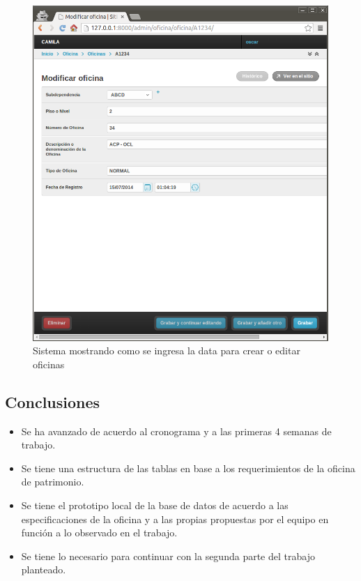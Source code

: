 \begin{figure}[h!]
  \centering
  \includegraphics[scale=0.4]{images/activities/camila/admin-oficinas-2.png}
  \caption{Sistema mostrando como se ingresa la data para crear o editar oficinas}
  \label{fig:admin-oficinas-2}
\end{figure}

\subsection{Conclusiones}

\begin{itemize}
\item Se ha avanzado de acuerdo al cronograma y a las primeras 4 semanas de trabajo.
\item Se tiene una estructura de las tablas en base a los requerimientos de la oficina de patrimonio.
\item Se tiene el prototipo local de la base de datos de acuerdo a las especificaciones de la oficina y a las propias propuestas por el equipo en función a lo observado en el trabajo.
\item Se tiene lo necesario para continuar con la segunda parte del trabajo planteado.
\end{itemize}


